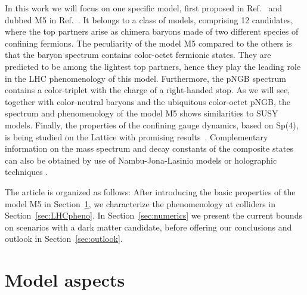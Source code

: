 \documentclass[preprintnumbers,nofootinbib,showpacs,eqsecnum,pre,12pt]{revtex4-1}
\begin{document}
In this work we will focus on one specific model, first proposed in Ref.~\cite{Ferretti:2013kya} and dubbed M5 in Ref.~\cite{Belyaev:2016ftv}. It belongs to a class of models, comprising 12 candidates, where the top partners arise as chimera baryons made of two different species of confining fermions. The peculiarity of the model M5 compared to the others is that the baryon spectrum contains color-octet fermionic states. They are predicted to be among the lightest top partners, hence they play the leading role in the LHC phenomenology of this model. Furthermore, the pNGB spectrum contains a color-triplet with the charge of a right-handed stop. As we will see, together with color-neutral baryons and the ubiquitous color-octet pNGB, the spectrum and phenomenology of the model M5 shows similarities to SUSY models. 
Finally, the properties of the confining gauge dynamics, based on Sp(4), is being studied on the Lattice with promising results~\cite{Bennett:2017kga,Lee:2018ztv,Bennett:2019jzz,Lee:2019pwp,Bennett:2019cxd}.
Complementary information on the mass spectrum and decay constants of the composite states can also be obtained by use of Nambu-Jona-Lasinio models \cite{Bizot:2016zyu} or holographic techniques \cite{Erdmenger:2020lvq,Erdmenger:2020flu}.

The article is organized as follows: After introducing the basic properties of the model M5 in Section~\ref{sec:modelaspects}, we characterize the phenomenology at colliders in Section~\ref{sec:LHCpheno}. 
In Section~\ref{sec:numerics} we present the current bounds on scenarios with a dark matter candidate, before offering our conclusions and outlook in Section~\ref{sec:outlook}.



\section{Model aspects} \label{sec:modelaspects}
\end{document}
